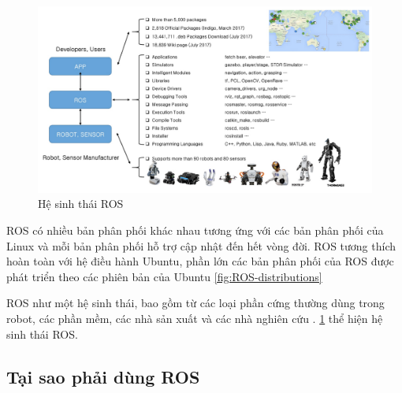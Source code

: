 {\begin{figure}[htbp]
	\centering
	\includegraphics[width=1\linewidth]{figures/Ecosystem.pdf}
	\caption{Hệ sinh thái ROS \cite{pyo2017ros}}
	\label{fig:Ecosystem}
\end{figure}

ROS có nhiều bản phân phối khác nhau tương ứng với các bản phân phối của Linux và mỗi bản phân phối hỗ trợ cập nhật đến hết vòng đời. ROS tương thích hoàn toàn với hệ điều hành Ubuntu, phần lớn các bản phân phối của ROS được phát triển theo các phiên bản của Ubuntu \figurename{ \ref{fig:ROS-distributions}}

ROS như một hệ sinh thái, bao gồm từ các loại phần cứng thường dùng trong robot, các phần mềm, các nhà sản xuất và các nhà nghiên cứu \cite{wikiros}. \figurename{ \ref{fig:Ecosystem}} thể hiện hệ sinh thái ROS.


\subsection{Tại sao phải dùng ROS}

}
